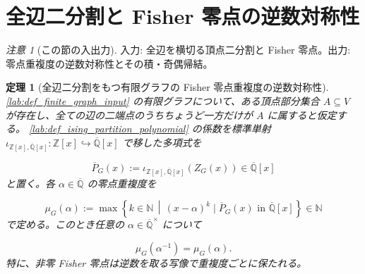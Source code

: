 \documentclass[11pt,a4paper]{article}
\newtheorem{theorem}[definition]{定理}
\theoremstyle{remark}
\newtheorem{remark}[definition]{注意}
\begin{document}
\section{全辺二分割と Fisher 零点の逆数対称性}

\begin{remark}[この節の入出力]
入力: 全辺を横切る頂点二分割と Fisher 零点。出力: 零点重複度の逆数対称性とその積・奇偶帰結。

\end{remark}

\begin{theorem}[全辺二分割をもつ有限グラフの Fisher 零点重複度の逆数対称性]\label{lab:theorem_full_cut_fisher_zero_reciprocal_multiplicity}
\cref{lab:def_finite_graph_input}
 の有限グラフについて、ある頂点部分集合 
$A\subseteq V$
 が存在し、全ての辺の二端点のうちちょうど一方だけが 
$A$
 に属すると仮定する。
\cref{lab:def_ising_partition_polynomial}
 の係数を標準単射 
$\iota_{\mathbb Z[x],\overline{\mathbb Q}[x]}:\mathbb Z[x]\hookrightarrow\overline{\mathbb Q}[x]$
 で移した多項式を

\[\overline P_G(x):=\iota_{\mathbb Z[x],\overline{\mathbb Q}[x]}\!\left(Z_G(x)\right)
\in\overline{\mathbb Q}[x]\]
と置く。各 
$\alpha\in\overline{\mathbb Q}$
 の零点重複度を

\[\mu_G(\alpha):=
\max\left\{
  k\in\mathbb N
  \,\middle|\,
  (x-\alpha)^k\mid\overline P_G(x)
  \text{ in }\overline{\mathbb Q}[x]
\right\}
\in\mathbb N\]
で定める。このとき任意の 
$\alpha\in\overline{\mathbb Q}^{\times}$
 について

\[\mu_G(\alpha^{-1})=\mu_G(\alpha).\]
特に、非零 Fisher 零点は逆数を取る写像で重複度ごとに保たれる。

\end{theorem}
\end{document}
